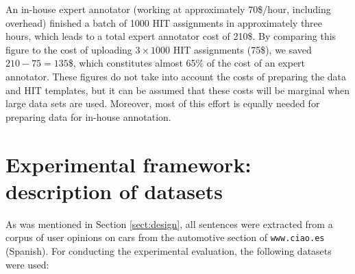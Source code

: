 \documentclass[11pt, a4paper,onecolumn]{article}
\begin{document}
An in-house expert annotator (working at approximately 70\$/hour, including overhead) finished a batch of 1000 HIT assignments in approximately three hours, which leads to a total expert annotator cost of 210\$. By comparing this figure to the cost of uploading $3 \times 1000$ HIT assignments (75\$), we saved $210 - 75 = 135$\$, which constitutes almost 65\% of the cost of an expert annotator. These figures do not take into account the costs of preparing the data and HIT templates, but it can be assumed that these costs will be marginal when large data sets are used. Moreover, most of this effort is equally needed for preparing data for in-house annotation.






\section{Experimental framework: description of datasets}
\label{datasets}

As was mentioned in Section \ref{sect:design}, all sentences were extracted from a corpus of user opinions on cars from the automotive section of \texttt{www.ciao.es} (Spanish). For conducting the experimental evaluation, the following datasets were used:
\end{document}
